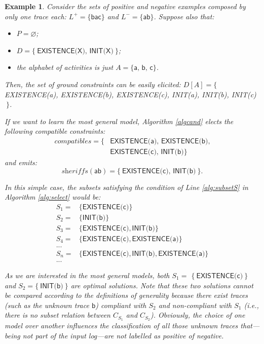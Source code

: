 \documentclass[a4wide,11pt]{article}
\theoremstyle{definition}
\theoremstyle{plain}
\newtheorem{example}{Example}[section]
\newcommand{\sheriff}{sheriffs}
\begin{document}
\begin{example}
Consider the sets of positive and negative examples composed by only one trace each: $L^+=\{\textsf{bac}\}$ and $L^-=\{\textsf{ab}\}$. Suppose also that:
\begin{itemize}
\item $P=\varnothing$;
\item $D=\{\ \textsf{EXISTENCE(X), INIT(X)}\ \}$;
\item the alphabet of activities is just $A=\{\textsf{a, b, c}\}$.
\end{itemize}
%
Then, the set of ground constraints can be easily elicited: $D[A]=\{$ \textsf{EXISTENCE(a), EXISTENCE(b), EXISTENCE(c), INIT(a), INIT(b), INIT(c)}$\ \}$.

If we want to learn the most general model, Algorithm \ref{algcand} elects the following compatible constraints:
\begin{align*}
	{compatibles}=\{ & \textsf{EXISTENCE(a), EXISTENCE(b)},\\
	& \textsf{EXISTENCE(c), INIT(b)}\}
\end{align*}
\noindent and emits:
$$\textit{\sheriff}(\textsf{ab})=\{\ \textsf{EXISTENCE(c), INIT(b)}\ \}.$$

In this simple case, the subsets satisfying the condition of Line \ref{alg:subsetS} in Algorithm \ref{alg:select} would be: 
\begin{align*}
 S_1= &  \{\textsf{EXISTENCE(c)}\}  \\
 S_2= &  \{\textsf{INIT(b)}\}   \\
 S_3= &  \{\textsf{EXISTENCE(c)}, \textsf{INIT(b)}\} \\
 S_4= & \{\textsf{EXISTENCE(c)}, \textsf{EXISTENCE(a)}\} \\
  ... & \\
 S_n= & \{\textsf{EXISTENCE(c)}, \textsf{INIT(b)}, \textsf{EXISTENCE(a)}\} \\
 ... &
\end{align*}

As we are interested in the most general models, both $S_1=$ $\{\ \textsf{EXISTENCE(c)}\ \}$ and $S_2=\{\ \textsf{INIT(b)}\ \}$ are optimal solutions. Note that these two solutions cannot be compared according to the definitions of generality because there exist traces (such as the unknown trace $\textsf{b}$) compliant with $S_2$ and non-compliant with $S_1$ (i.e., there is no subset relation between ${C}_{S_1}$ and ${C}_{S_2}$).
Obviously, the choice of one model over another influences the classification of all those unknown traces that---being not part of the input log---are not labelled as positive of negative.


\end{example}
\end{document}
